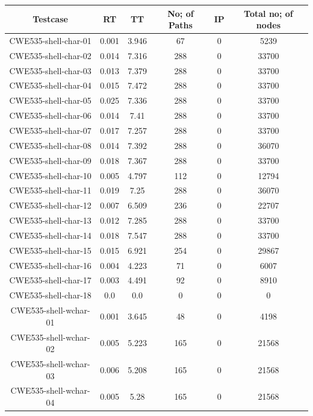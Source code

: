 \begin{table}[h!]
\centering
 \begin{tabular}{||c |c |c |c |c| c||} 
 \hline
 \textbf{Testcase} & \textbf{RT} & \textbf{TT} & \textbf{No; of Paths} & \textbf{IP}& \textbf{Total no; of nodes} \\ [0.5ex] 
 \hline\hline
 CWE535-shell-char-01 & 0.001 & 3.946 &67 & 0&5239\\ 
 \hline
CWE535-shell-char-02 & 0.014 & 7.316 & 288&0& 33700 \\
 \hline
 CWE535-shell-char-03 & 0.013 & 7.379 & 288&0& 33700\\ 
 \hline
 CWE535-shell-char-04 & 0.015 & 7.472 & 288&0& 33700\\ 
 \hline
 CWE535-shell-char-05 & 0.025 & 7.336 & 288&0& 33700\\ 
 \hline
 CWE535-shell-char-06 & 0.014 & 7.41 & 288&0& 33700\\ 
 \hline
 CWE535-shell-char-07 & 0.017 & 7.257 & 288&0& 33700\\ 
 \hline
 CWE535-shell-char-08 & 0.014 & 7.392 & 288&0& 36070\\ 
 \hline
 CWE535-shell-char-09 & 0.018 & 7.367 & 288&0& 33700\\ 
 \hline
 CWE535-shell-char-10 & 0.005 & 4.797 & 112&0&12794 \\ 
 \hline
 CWE535-shell-char-11 & 0.019 & 7.25 & 288&0&36070 \\ 
 \hline
 CWE535-shell-char-12 &0.007  & 6.509 &236&0& 22707\\ 
 \hline
 CWE535-shell-char-13 &0.012  & 7.285 & 288&0& 33700\\ 
 \hline
 CWE535-shell-char-14 & 0.018 & 7.547 & 288&0& 33700\\ 
 \hline
 CWE535-shell-char-15 & 0.015 & 6.921 &254&0&29867\\ 
 \hline
  CWE535-shell-char-16 & 0.004 & 4.223 & 71&0& 6007\\ 
 \hline
  CWE535-shell-char-17 & 0.003 &4.491 & 92&0& 8910\\ 
 \hline
  CWE535-shell-char-18 & 0.0 & 0.0 & 0&0& 0\\ 
  \hline
  CWE535-shell-wchar-01 & 0.001 & 3.645 &48 & 0& 4198\\ 
 \hline
CWE535-shell-wchar-02 & 0.005 & 5.223 & 165&0& 21568\\ 
 \hline
 CWE535-shell-wchar-03 & 0.006 & 5.208 & 165&0& 21568\\ 
 \hline
 CWE535-shell-wchar-04 & 0.005 & 5.28 & 165&0& 21568\\ 

\end{tabular}
\end{table}

